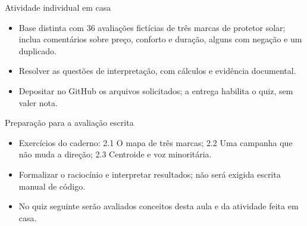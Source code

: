\documentclass[10pt,aspectratio=169]{beamer}
\begin{document}
\begin{frame}[t]{Atividade individual em casa}
\small
\begin{itemize}
\item Base distinta com 36 avaliações fictícias de três marcas de protetor solar; inclua comentários sobre preço, conforto e duração, alguns com negação e um duplicado.
\item Resolver as questões de interpretação, com cálculos e evidência documental.
\item Depositar no GitHub os arquivos solicitados; a entrega habilita o quiz, sem valer nota.
\end{itemize}
\end{frame}

\begin{frame}[t]{Preparação para a avaliação escrita}
\small
\begin{itemize}
\item Exercícios do caderno: 2.1 O mapa de três marcas; 2.2 Uma campanha que não muda a direção; 2.3 Centroide e voz minoritária.
\item Formalizar o raciocínio e interpretar resultados; não será exigida escrita manual de código.
\item No quiz seguinte serão avaliados conceitos desta aula e da atividade feita em casa.
\end{itemize}
\end{frame}
\end{document}
